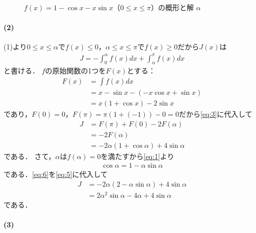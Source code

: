 \documentclass[../../main.tex]{subfiles}
\begin{document}
\begin{figure}[htb]
\begin{center}
  \end{center}
  \caption{$f(x) = 1 - \cos x - x\sin x$（$0 \le x \le \pi$）の概形と解 $\alpha$}
\end{figure}

\paragraph{(2)}

(1)より$0\le x\le\alpha$で$f(x)\le0$，$\alpha\le x\le\pi$で$f(x)\ge0$だから$J(x)$は
\begin{align}
  J=-\int_0^\alpha f(x)dx+\int_\alpha^\pi f(x)dx \label{eq:3}
\end{align}
と書ける．
$f$の原始関数の1つを$F(x)$とする：
\begin{align}
  F(x)
  &=\int f(x)dx \\
  &=x-\sin x-(-x\cos x+\sin x) \\
  &=x(1+\cos x)-2\sin x \label{eq:4}
\end{align}
であり，$F(0)=0$，$F(\pi)=\pi(1+(-1))-0=0$だから\cref{eq:3}に代入して
\begin{align}
  J
  &=F(\pi)+F(0)-2F(\alpha) \\
  &=-2F(\alpha) \\
  &=-2\alpha(1+\cos\alpha)+4\sin\alpha \label{eq:5}
\end{align}
である．
さて，$\alpha$は$f(\alpha)=0$を満たすから\cref{eq:1}より
\begin{align}
  \cos\alpha=1-\alpha\sin\alpha \label{eq:6}
\end{align}
である．\cref{eq:6}を\cref{eq:5}に代入して
\begin{align}
  J
  &=-2\alpha(2-\alpha\sin\alpha)+4\sin\alpha \\
  &=2\alpha^2\sin\alpha-4\alpha+4\sin\alpha \label{eq:7}
\end{align}
である．

\paragraph{(3)}
\end{document}
